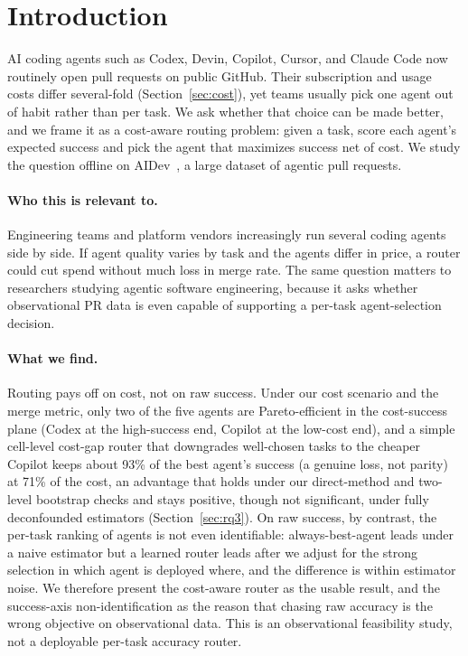 \documentclass[sigconf,nonacm]{acmart}
\begin{document}
\section{Introduction}

AI coding agents such as Codex, Devin, Copilot, Cursor, and Claude Code now routinely open pull requests on public GitHub. Their subscription and usage costs differ several-fold (Section~\ref{sec:cost}), yet teams usually pick one agent out of habit rather than per task. We ask whether that choice can be made better, and we frame it as a cost-aware routing problem: given a task, score each agent's expected success and pick the agent that maximizes success net of cost. We study the question offline on AIDev~\cite{li2026aidev}, a large dataset of agentic pull requests.

\paragraph{Who this is relevant to.} Engineering teams and platform vendors increasingly run several coding agents side by side. If agent quality varies by task and the agents differ in price, a router could cut spend without much loss in merge rate. The same question matters to researchers studying agentic software engineering, because it asks whether observational PR data is even capable of supporting a per-task agent-selection decision.

\paragraph{What we find.} Routing pays off on cost, not on raw success. Under our cost scenario and the merge metric, only two of the five agents are Pareto-efficient in the cost-success plane (Codex at the high-success end, Copilot at the low-cost end), and a simple cell-level cost-gap router that downgrades well-chosen tasks to the cheaper Copilot keeps about 93\% of the best agent's success (a genuine loss, not parity) at 71\% of the cost, an advantage that holds under our direct-method and two-level bootstrap checks and stays positive, though not significant, under fully deconfounded estimators (Section~\ref{sec:rq3}). On raw success, by contrast, the per-task ranking of agents is not even identifiable: always-best-agent leads under a naive estimator but a learned router leads after we adjust for the strong selection in which agent is deployed where, and the difference is within estimator noise. We therefore present the cost-aware router as the usable result, and the success-axis non-identification as the reason that chasing raw accuracy is the wrong objective on observational data. This is an observational feasibility study, not a deployable per-task accuracy router.
\end{document}
